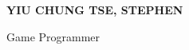 {\fontsize{26}{30}\selectfont\bfseries\color{darktext}YIU CHUNG TSE, STEPHEN}\par
\vspace{3pt}\hspace{215pt}
{\large\color{darktext}Game Programmer}\par
\par
